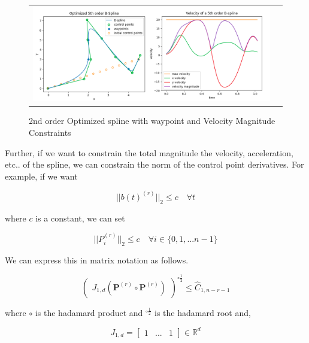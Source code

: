 \documentclass{article}
\begin{document}
\begin{figure}[h]
\begin{tabular}{ll}
\includegraphics[scale=.28]{VelocityMagnitudeConstraint.png}
\end{tabular}
\caption{2nd order Optimized spline with waypoint and Velocity Magnitude Constraints}
\label{Fig:VelocityMagnitudeConstraint.png}
\end{figure}

Further, if we want to constrain the total magnitude the velocity, acceleration, etc.. of the spline, we can constrain the norm of the control point derivatives. For example, if we want

\begin{equation}
    ||b(t)^{(r)}||_2 \leq c \quad \forall t
\end{equation}

where \(c\) is a constant, we can set

\begin{equation}
    ||P_i^{(r)}||_2 \leq c \quad \forall i \in \{0 , 1 , ... n-1\}
\end{equation}

We can express this in matrix notation as follows.

\begin{equation}
    \begin{pmatrix}J_{1,d}(\textbf{P}^{(r)} \circ \textbf{P}^{(r)})\end{pmatrix}^{\circ \frac{1}{2}} \leq \hat{C}_{1,n-r-1} 
\end{equation}

where \(\circ\) is the hadamard product and \(^{\circ \frac{1}{2}} \) is the hadamard root and, 

\begin{equation}
J_{1,d} = \begin{bmatrix}
    1 & ... & 1
    \end{bmatrix} \in \mathbb{R}^{d}
\end{equation}
\end{document}
